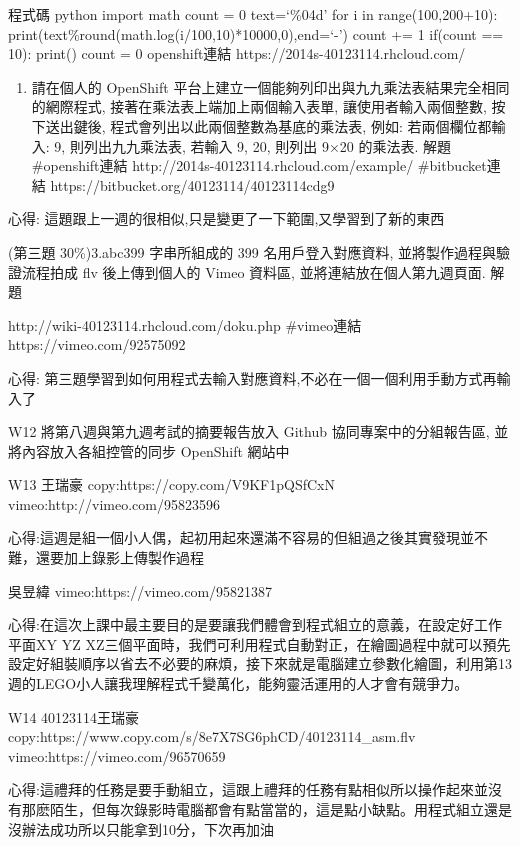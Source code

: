\documentclass[]{article}
\begin{document}
程式碼 python import math count = 0 text=`\%04d' for i in
range(100,200+10):
print(text\%round(math.log(i/100,10)*10000,0),end=`-') count += 1
if(count == 10): print() count = 0 openshift連結
https://2014s-40123114.rhcloud.com/

\begin{enumerate}
\def\labelenumi{\arabic{enumi}.}
\setcounter{enumi}{1}
\itemsep1pt\parskip0pt
\item
  請在個人的 OpenShift
  平台上建立一個能夠列印出與九九乘法表結果完全相同的網際程式,
  接著在乘法表上端加上兩個輸入表單, 讓使用者輸入兩個整數, 按下送出鍵後,
  程式會列出以此兩個整數為基底的乘法表, 例如: 若兩個欄位都輸入: 9,
  則列出九九乘法表, 若輸入 9, 20, 則列出 9×20 的乘法表. 解題
  \#openshift連結 http://2014s-40123114.rhcloud.com/example/
  \#bitbucket連結 https://bitbucket.org/40123114/40123114cdg9
\end{enumerate}

心得: 這題跟上一週的很相似,只是變更了一下範圍,又學習到了新的東西

(第三題 30\%)3.abc399 字串所組成的 399 名用戶登入對應資料,
並將製作過程與驗證流程拍成 flv 後上傳到個人的 Vimeo 資料區,
並將連結放在個人第九週頁面. 解題

http://wiki-40123114.rhcloud.com/doku.php \#vimeo連結
https://vimeo.com/92575092

心得:
第三題學習到如何用程式去輸入對應資料,不必在一個一個利用手動方式再輸入了

W12 將第八週與第九週考試的摘要報告放入 Github 協同專案中的分組報告區,
並將內容放入各組控管的同步 OpenShift 網站中

W13 王瑞豪 copy:https://copy.com/V9KF1pQSfCxN
vimeo:http://vimeo.com/95823596

心得:這週是組一個小人偶，起初用起來還滿不容易的但組過之後其實發現並不難，還要加上錄影上傳製作過程

吳昱緯 vimeo:https://vimeo.com/95821387

心得:在這次上課中最主要目的是要讓我們體會到程式組立的意義，在設定好工作平面XY
YZ
XZ三個平面時，我們可利用程式自動對正，在繪圖過程中就可以預先設定好組裝順序以省去不必要的麻煩，接下來就是電腦建立參數化繪圖，利用第13週的LEGO小人讓我理解程式千變萬化，能夠靈活運用的人才會有競爭力。

W14 40123114王瑞豪
copy:https://www.copy.com/s/8e7X7SG6phCD/40123114\_asm.flv
vimeo:https://vimeo.com/96570659

心得:這禮拜的任務是要手動組立，這跟上禮拜的任務有點相似所以操作起來並沒有那麽陌生，但每次錄影時電腦都會有點當當的，這是點小缺點。用程式組立還是沒辦法成功所以只能拿到10分，下次再加油
\end{document}
